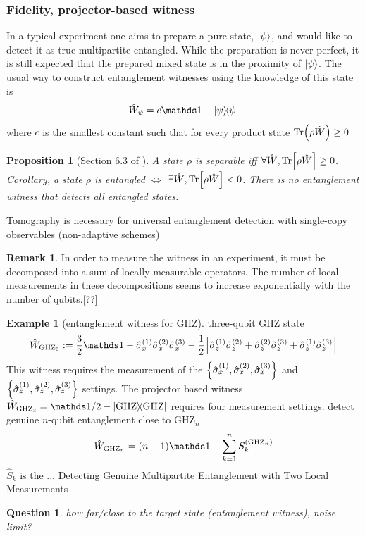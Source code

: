 \documentclass[
10pt,
aps,
pra,
linenumbers,
floatfix,
]{revtex4-2}
\theoremstyle{plain}
\newtheorem{proposition}{Proposition}
\newtheorem{question}{Question}
\theoremstyle{definition}
\newtheorem{example}{Example}
\newtheorem{remark}{Remark}
\newcommand{\ew}{\hat{W}}
\newcommand{\ghz}{\text{GHZ}}
\newcommand{\stbz}{\hat{S}}
\newcommand{\dm}{\rho}
\begin{document}
\subsubsection{Fidelity, projector-based witness}
In a typical experiment one aims to prepare a pure state, $\ket{\psi}$, and would like to detect it as true multipartite entangled. 
While the preparation is never perfect, it is still expected that the prepared mixed state is in the proximity of $\ket{\psi}$. The usual way to construct entanglement witnesses using the knowledge of this state is
\begin{equation}
	\ew_{\psi} = c\identity - \op{\psi} 
	\label{eq:entanglement_witness}
\end{equation}
where $c$ is the smallest constant such that for every product state $\Tr(\dm\ew)\ge 0$
\begin{proposition}[Section 6.3 of \cite{heinosaariMathematicalLanguageQuantum2011}]
	A state $\dm$ is separable iff $\forall \ew,\Tr[\dm \ew]\ge 0$. 
	Corollary, a state $\dm$ is entangled $\iff$  $\exists \ew,\Tr[\dm \ew]<0$. 
	There is no entanglement witness that detects all entangled states.
\end{proposition}
Tomography is necessary for universal entanglement detection with single-copy observables (non-adaptive schemes)
\cite{luTomographyNecessaryUniversal2016}
\begin{remark}
In order to measure the witness in an experiment, it must be decomposed into a sum of locally measurable operators. The number of local measurements in these decompositions seems to increase exponentially with the number of qubits.[??]
\end{remark}
\begin{example}[entanglement witness for GHZ]
	three-qubit GHZ state 
	\cite{tothDetectingGenuineMultipartite2005}
	\begin{equation}
		\ew_{\ghz_3} := \frac{3}{2} \identity - \sx^{(1)}\sx^{(2)}\sx^{(3)}
		- \frac{1}{2} \qty[
			\sz^{(1)} \sz^{(2)} + 
			\sz^{(2)} \sz^{(3)} + 
			\sz^{(1)} \sz^{(3)} 
		]
	\end{equation}
	This witness requires the measurement of the $\qty{\hat{\sigma}_x^{(1)},\hat{\sigma}_x^{(2)},\hat{\sigma}_x^{(3)}}$ and $\qty{\hat{\sigma}_z^{(1)},\hat{\sigma}_z^{(2)},\hat{\sigma}_z^{(3)}}$ settings.
	The projector based witness $\ew_{\ghz_3}=\identity/2 - \op{\ghz}$ requires four measurement settings.
	detect genuine $n$-qubit entanglement close to $\ghz_n$
	\begin{equation}
		\ew_{\ghz_n} = (n-1) \identity - \sum_{k=1}^n S_k^{(\ghz_n)}
	\end{equation}
	$\stbz_k$ is the  ... \cite{tothEntanglementDetectionStabilizer2005}
	Detecting Genuine Multipartite Entanglement with Two Local Measurements \cite{tothDetectingGenuineMultipartite2005}
\end{example}
\begin{question}
	how far/close to the target state (entanglement witness), noise limit?
\end{question}
\end{document}
